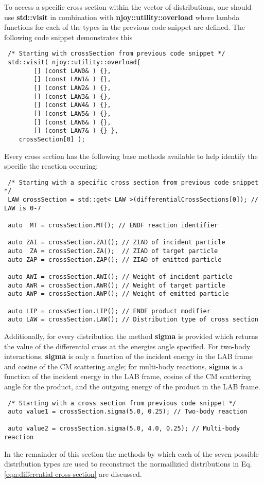 \documentclass[../main.tex]{subfiles}
\begin{document}
To access a specific cross section within the vector of distributions, one should use \textbf{std::visit} in combination with \textbf{njoy::utility::overload} where lambda functions for each of the types in the previous code snippet are defined. The following code snippet demonstrates this
\begin{lstlisting}
 /* Starting with crossSection from previous code snippet */ 
 std::visit( njoy::utility::overload{ 
        [] (const LAW0& ) {},
        [] (const LAW1& ) {},
        [] (const LAW2& ) {},
        [] (const LAW3& ) {}, 
        [] (const LAW4& ) {},
        [] (const LAW5& ) {}, 
        [] (const LAW6& ) {},
        [] (const LAW7& ) {} },
    crossSection[0] );
\end{lstlisting}

Every cross section has the following base methods available to help identify the specific the reaction occuring:
\begin{lstlisting}
 /* Starting with a specific cross section from previous code snippet */
 LAW crossSection = std::get< LAW >(differentialCrossSections[0]); // LAW is 0-7
 
 auto  MT = crossSection.MT(); // ENDF reaction identifier

 auto ZAI = crossSection.ZAI(); // ZIAD of incident particle
 auto  ZA = crossSection.ZA();  // ZIAD of target particle 
 auto ZAP = crossSection.ZAP(); // ZIAD of emitted particle

 auto AWI = crossSection.AWI(); // Weight of incident particle
 auto AWR = crossSection.AWR(); // Weight of target particle
 auto AWP = crossSection.AWP(); // Weight of emitted particle
  
 auto LIP = crossSection.LIP(); // ENDF product modifier
 auto LAW = crossSection.LAW(); // Distribution type of cross section
\end{lstlisting}

Additionally, for every distribution the method \textbf{sigma} is provided which returns the value of the differential cross at the energies angle specified. For two-body interactions, \textbf{sigma} is only a function of the incident energy in the LAB frame and cosine of the CM scattering angle; for multi-body reactions, \textbf{sigma} is a function of the incident energy in the LAB frame, cosine of the CM scattering angle for the product, and the outgoing energy of the product in the LAB frame.
\begin{lstlisting}
 /* Starting with a cross section from previous code snippet */
 auto value1 = crossSection.sigma(5.0, 0.25); // Two-body reaction
 
 auto value2 = crossSection.sigma(5.0, 4.0, 0.25); // Multi-body reaction
\end{lstlisting}
In the remainder of this section the methods by which each of the seven possible distribution types are used to reconstruct the normailizied distributions in Eq. \eqref{eqn:differential-cross-section} are discussed. 
\end{document}
